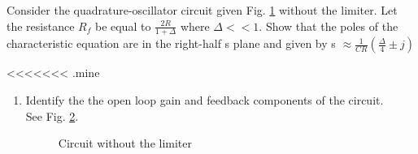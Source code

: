 Consider the quadrature-oscillator circuit given Fig. \ref{fig:es17btech11009_fig1} without the limiter. Let the resistance $R_{f}$ be equal to $\frac{2R}{1 + \Delta}$ where $\Delta << 1$. Show that the poles of the characteristic equation are in the right-half s plane and given by 
s $\approx \frac{1}{CR}(\frac{\Delta}{4}\pm j)$
\begin{figure}[!ht]
	\begin{center}
		\resizebox{\columnwidth}{!}{}
	\end{center}
\caption{}
\label{fig:es17btech11009_fig1}
\end{figure}
<<<<<<< .mine
\begin{enumerate}[label=\arabic*.,ref=\theenumi]
\item Identify the the open loop gain and feedback  components of the circuit.
\\
\solution See Fig. \ref{fig:es17btech11009_b4}.
\begin{figure}[!ht]
	\begin{center}
		\resizebox{\columnwidth}{!}{}
	\end{center}
\caption{Circuit without the limiter}
\label{fig:es17btech11009_b4}
\end{figure}


\end{enumerate}
